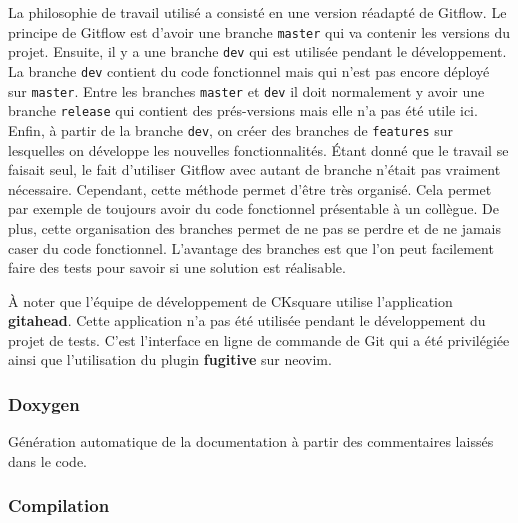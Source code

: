 \documentclass[a4paper]{article}
\begin{document}
La philosophie de travail utilisé a consisté en une version réadapté de Gitflow.
Le principe de Gitflow est d'avoir une branche \lstinline{master} qui va
contenir les versions du projet. Ensuite, il y a une branche \lstinline{dev} qui
est utilisée pendant le développement. La branche \lstinline{dev} contient du
code fonctionnel mais qui n'est pas encore déployé sur \lstinline{master}. Entre
les branches \lstinline{master} et \lstinline{dev} il doit normalement y avoir
une branche \lstinline{release} qui contient des prés-versions mais elle n'a pas
été utile ici. Enfin, à partir de la branche \lstinline{dev}, on créer des
branches de \lstinline{features} sur lesquelles on développe les nouvelles
fonctionnalités. Étant donné que le travail se faisait seul, le fait d'utiliser
Gitflow avec autant de branche n'était pas vraiment nécessaire. Cependant, cette
méthode permet d'être très organisé. Cela permet par exemple de toujours avoir
du code fonctionnel présentable à un collègue. De plus, cette organisation des
branches permet de ne pas se perdre et de ne jamais caser du code fonctionnel.
L'avantage des branches est que l'on peut facilement faire des tests pour savoir
si une solution est réalisable.

À noter que l'équipe de développement de CKsquare utilise l'application
\textbf{gitahead}. Cette application n'a pas été utilisée pendant le
développement du projet de tests. C'est l'interface en ligne de commande de Git
qui a été privilégiée ainsi que l'utilisation du plugin \textbf{fugitive} sur
neovim.

\subsubsection{Doxygen}

Génération automatique de la documentation à partir des commentaires laissés
dans le code.

\subsubsection{Compilation}
\end{document}
